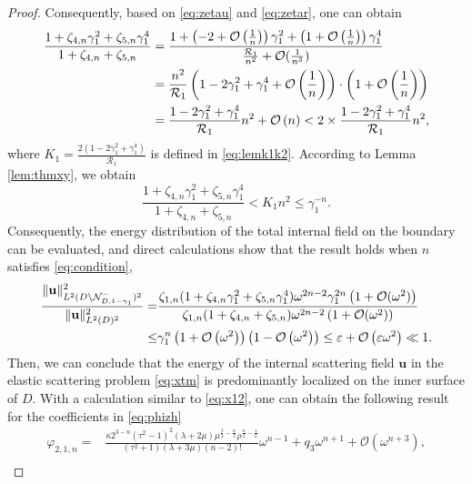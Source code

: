 \documentclass[11pt,reqno,twoside]{amsart}
\theoremstyle{definition}
\theoremstyle{remark}
\numberwithin{equation}{section}
\newcommand{\bu}{\mathbf{u}}
\begin{document}
\begin{proof}
	Consequently, based on \eqref{eq:zetau} and \eqref{eq:zetar}, one can obtain 
	\begin{align}
		\frac{1+\zeta _{4,n} \gamma_1 ^{2}+\zeta _{5,n} \gamma_1 ^{4}}{1+\zeta _{4,n}+\zeta _{5,n}}&=\frac{1+\left(-2+\mathcal{O}\left(\frac{1}{n}\right)\right)\gamma_{1}^{2}+\left(1+\mathcal{O}\left(\frac{1}{n}\right)\right)\gamma_{1}^{4}}{\frac{\mathcal{R}_{1}}{n^2}+\mathcal{O}(\frac{1}{n^3})}\notag\\
		&=\frac{n^2}{\mathcal{R}_{1}}\left(1-2\gamma_{1}^2+\gamma_{1}^4+\mathcal{O}\left(\frac{1}{n}\right)\right)\cdot\left(1+\mathcal{O}\left(\frac{1}{n}\right)\right)\notag\\
		&=\frac{1-2\gamma_{1}^2+\gamma_{1}^4}{\mathcal{R}_{1}} n^2+\mathcal{O}\left(n\right)<2 \times \frac{1-2\gamma_{1}^2+\gamma_{1}^4}{\mathcal{R}_{1}} n^2,\notag
	\end{align}  
	where $K_{1} = \frac{2\left(1 - 2\gamma_{1}^2 + \gamma_{1}^4\right)}{\mathcal{R}_{1}}$ is defined in \eqref{eq:lemk1k2}. According to Lemma \ref{lem:thmxy}, we obtain
	\[\frac{1+\zeta _{4,n} \gamma_1 ^{2}+\zeta _{5,n} \gamma_1 ^{4}}{1+\zeta _{4,n}+\zeta _{5,n}}<K_{1}n^2\leq\gamma_1^{-n}.\]
	Consequently, the energy distribution of the total internal field on the boundary can be evaluated, and direct calculations show that the result holds when $n$ satisfies \eqref{eq:condition},
	\begin{align}
		\frac{\|\mathbf{u}\|_{L^2(D \setminus \mathcal{N}_{D,1-\gamma_{1}}^{-})^2}^2}{\|\mathbf{u}\|_{L^2(D)^2}^2}=
		&\frac{\zeta _{1,n}(1 +\zeta _{4,n} \gamma_1 ^{2}+\zeta _{5,n} \gamma_1 ^{4})\omega ^{2n-2}\gamma_1 ^{2n}\left(1+\mathcal{O}( \omega^{2})\right)}{\zeta _{1,n}(1 +\zeta _{4,n} +\zeta _{5,n} )\omega ^{2n-2}\left(1+\mathcal{O}(\omega^{2})\right)}\notag\\
		\leq&\gamma_1^{n}\left(1+\mathcal{O}\left(\omega^2\right)\right)\left(1-\mathcal{O}\left(\omega^2\right)\right)\leq\varepsilon+\mathcal{O}\left(\varepsilon\omega^2\right)\ll1.\notag
	\end{align}
	Then, we can conclude that the energy of the internal scattering field $\bu$ in the elastic scattering problem \eqref{eq:xtm} is predominantly localized on the inner surface of $D$.
	With a calculation similar to \eqref{eq:x12}, one can obtain the following result for the coefficients in \eqref{eq:phizh}
	\begin{align}\label{eq:phi212}
		\varphi _{2,1,n}=&\frac{\kappa2^{3-n} \left(\tau ^2-1\right)^2 (\lambda +2 \mu ) \mu ^{\frac{3}{2}-\frac{n}{2}} \rho ^{\frac{n}{2}-\frac{1}{2}}}{\left(\tau ^2+1\right) (\lambda +3 \mu ) (n-2)!}\omega ^{n-1}+q_{3}\omega ^{n+1}+ \mathcal{O}(\omega^{n+3}),\\

\end{align}
\end{proof}
\end{document}
